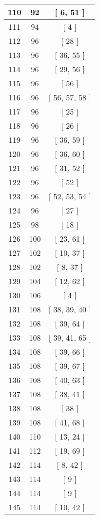 \begin{center}
\begin{longtable}[H]{|| c c c ||}
\hline
110 & 92 & [ 6, 51 ] \\ 
\hline
111 & 94 & [ 4 ] \\ 
\hline
112 & 96 & [ 28 ] \\ 
\hline
113 & 96 & [ 36, 55 ] \\ 
\hline
114 & 96 & [ 29, 56 ] \\ 
\hline
115 & 96 & [ 56 ] \\ 
\hline
116 & 96 & [ 56, 57, 58 ] \\ 
\hline
117 & 96 & [ 25 ] \\ 
\hline
118 & 96 & [ 26 ] \\ 
\hline
119 & 96 & [ 36, 59 ] \\ 
\hline
120 & 96 & [ 36, 60 ] \\ 
\hline
121 & 96 & [ 31, 52 ] \\ 
\hline
122 & 96 & [ 52 ] \\ 
\hline
123 & 96 & [ 52, 53, 54 ] \\ 
\hline
124 & 96 & [ 27 ] \\ 
\hline
125 & 98 & [ 18 ] \\ 
\hline
126 & 100 & [ 23, 61 ] \\ 
\hline
127 & 102 & [ 10, 37 ] \\ 
\hline
128 & 102 & [ 8, 37 ] \\ 
\hline
129 & 104 & [ 12, 62 ] \\ 
\hline
130 & 106 & [ 4 ] \\ 
\hline
131 & 108 & [ 38, 39, 40 ] \\ 
\hline
132 & 108 & [ 39, 64 ] \\ 
\hline
133 & 108 & [ 39, 41, 65 ] \\ 
\hline
134 & 108 & [ 39, 66 ] \\ 
\hline
135 & 108 & [ 39, 67 ] \\ 
\hline
136 & 108 & [ 40, 63 ] \\ 
\hline
137 & 108 & [ 38, 41 ] \\ 
\hline
138 & 108 & [ 38 ] \\ 
\hline
139 & 108 & [ 41, 68 ] \\ 
\hline
140 & 110 & [ 13, 24 ] \\ 
\hline
141 & 112 & [ 19, 69 ] \\ 
\hline
142 & 114 & [ 8, 42 ] \\ 
\hline
143 & 114 & [ 9 ] \\ 
\hline
144 & 114 & [ 9 ] \\ 
\hline
145 & 114 & [ 10, 42 ] \\ 

\end{longtable}
\end{center}
